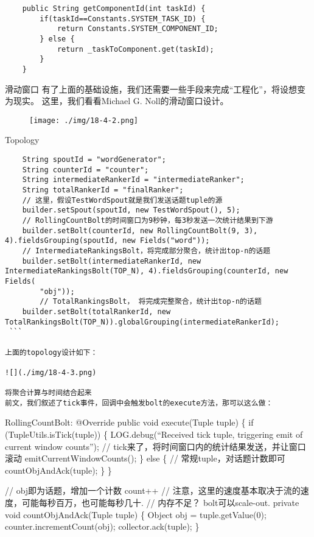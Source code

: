\begin{verbatim}
    public String getComponentId(int taskId) {
        if(taskId==Constants.SYSTEM_TASK_ID) {
            return Constants.SYSTEM_COMPONENT_ID;
        } else {
            return _taskToComponent.get(taskId);
        }
    }
\end{verbatim}

滑动窗口
有了上面的基础设施，我们还需要一些手段来完成``工程化''，将设想变为现实。
这里，我们看看Michael G. Noll的滑动窗口设计。

\begin{figure}
\centering
\texttt{[image: ./img/18-4-2.png]}
\caption{}
\end{figure}

Topology

\begin{verbatim}
    String spoutId = "wordGenerator";
    String counterId = "counter";
    String intermediateRankerId = "intermediateRanker";
    String totalRankerId = "finalRanker";
    // 这里，假设TestWordSpout就是我们发送话题tuple的源
    builder.setSpout(spoutId, new TestWordSpout(), 5);
    // RollingCountBolt的时间窗口为9秒钟，每3秒发送一次统计结果到下游
    builder.setBolt(counterId, new RollingCountBolt(9, 3), 4).fieldsGrouping(spoutId, new Fields("word"));
    // IntermediateRankingsBolt，将完成部分聚合，统计出top-n的话题
    builder.setBolt(intermediateRankerId, new IntermediateRankingsBolt(TOP_N), 4).fieldsGrouping(counterId, new Fields(
        "obj"));
        // TotalRankingsBolt， 将完成完整聚合，统计出top-n的话题
    builder.setBolt(totalRankerId, new TotalRankingsBolt(TOP_N)).globalGrouping(intermediateRankerId);
 ```

上面的topology设计如下：

![](./img/18-4-3.png)

将聚合计算与时间结合起来
前文，我们叙述了tick事件，回调中会触发bolt的execute方法，那可以这么做：
\end{verbatim}

RollingCountBolt: @Override public void execute(Tuple tuple) \{ if
(TupleUtils.isTick(tuple)) \{ LOG.debug(``Received tick tuple,
triggering emit of current window counts''); //
tick来了，将时间窗口内的统计结果发送，并让窗口滚动
emitCurrentWindowCounts(); \} else \{ // 常规tuple，对话题计数即可
countObjAndAck(tuple); \} \}

// obj即为话题，增加一个计数 count++ //
注意，这里的速度基本取决于流的速度，可能每秒百万，也可能每秒几十. //
内存不足？ bolt可以scale-out. private void countObjAndAck(Tuple tuple)
\{ Object obj = tuple.getValue(0); counter.incrementCount(obj);
collector.ack(tuple); \}

